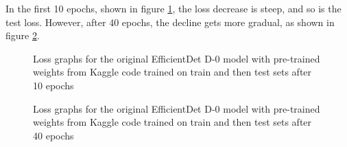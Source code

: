 In the first 10 epochs, shown in figure \ref{fig:fig25}, the loss decrease is steep, and so is the test loss. However, after 40 epochs, the decline gets more gradual, as shown in figure \ref{fig:fig26}.

\begin{figure}[H]
    \caption{Loss graphs for the original EfficientDet D-0 model with pre-trained weights from Kaggle code trained on train and then test sets after 10 epochs}
    \label{fig:fig25}
\end{figure}

\begin{figure}[H]
    \caption{Loss graphs for the original EfficientDet D-0 model with pre-trained weights from Kaggle code trained on train and then test sets after 40 epochs}
    \label{fig:fig26}
\end{figure}

